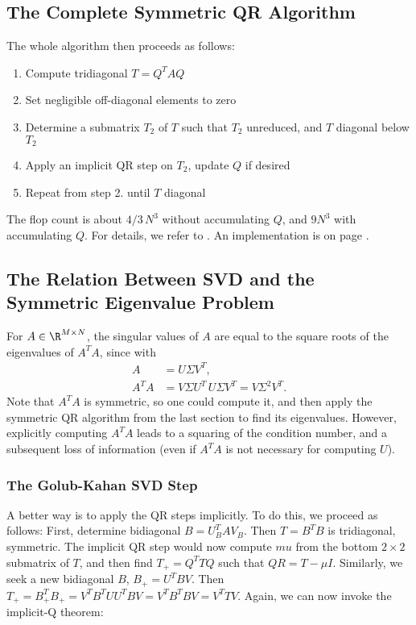 \documentclass[11pt]{article}
\begin{document}
\subsection{The Complete Symmetric QR Algorithm}
The whole algorithm then proceeds as follows:
\begin{enumerate}
\item Compute tridiagonal $T=Q^TAQ$
\item Set negligible off-diagonal elements to zero
\item Determine a submatrix $T_2$ of $T$ such that $T_2$ unreduced, and $T$ diagonal below $T_2$
\item Apply an implicit QR step on $T_2$, update $Q$ if desired
\item Repeat from step 2. until $T$ diagonal 
\end{enumerate}

The flop count is about $4/3\, N^3$ without accumulating $Q$, and $9N^3$ with accumulating $Q$. For details, we refer to \cite[section 8.2]{GolL96}. An implementation is on page \pageref{rc:symqrschur}.

\subsection{The Relation Between SVD and the Symmetric Eigenvalue Problem}
For $A\in\R^{M\times N}$, the singular values of $A$ are equal to the square roots of the eigenvalues of $A^TA$, since with
\begin{align*}
	A &= U\Sigma V^T, \\
	A^TA &= V\Sigma U^T\,U\Sigma V^T = V\Sigma^2 V^T.
\end{align*}
Note that $A^TA$ is symmetric, so one could compute it, and then apply the symmetric QR algorithm from the last section to find its eigenvalues. However, explicitly computing $A^TA$ leads to a squaring of the condition number, and a subsequent loss of information (even if $A^TA$ is not necessary for computing $U$).

\subsubsection{The Golub-Kahan SVD Step}
A better way is to apply the QR steps implicitly. To do this, we proceed as follows:
First, determine bidiagonal $B = U_B^T A V_B$. Then $T=B^TB$ is tridiagonal, symmetric. The implicit QR step would now compute $mu$ from the bottom $2\times 2$ submatrix of $T$, and then find $T_+ =  Q^T TQ$ such that $QR=T - \mu I$. Similarly, we seek a new bidiagonal $B$, $B_+ = U^TBV$. Then $T_+=B_+^TB_+=V^TB^TUU^TBV=V^TB^TBV=V^TTV$.
Again, we can now invoke the implicit-Q theorem:
\end{document}

